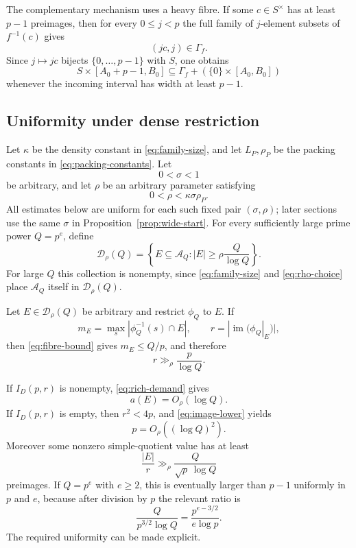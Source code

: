 The complementary mechanism uses a heavy fibre.  If some $c\in S^\times$ has at least $p-1$ preimages, then for every $0\le j<p$ the full family of $j$-element subsets of $f^{-1}(c)$ gives
\[
(jc,j)\in\Gamma_f.
\]
Since $j\mapsto jc$ bijects $\{0,\ldots,p-1\}$ with $S$, one obtains
\begin{equation}\label{eq:poor-rectangle}
S\times[A_0+p-1,B_0]
\subseteq
\Gamma_f+(\{0\}\times[A_0,B_0])
\end{equation}
whenever the incoming interval has width at least $p-1$.

\subsection{Uniformity under dense restriction}

Let $\kappa$ be the density constant in \eqref{eq:family-size}, and let $L_P,\rho_P$ be the packing constants in \eqref{eq:packing-constants}.  Let
\[
0<\sigma<1
\]
be arbitrary, and let $\rho$ be an arbitrary parameter satisfying
\begin{equation}\label{eq:rho-choice}
0<\rho<\kappa\sigma\rho_P.
\end{equation}
All estimates below are uniform for each such fixed pair $(\sigma,\rho)$; later sections use the same $\sigma$ in Proposition~\ref{prop:wide-start}.
For every sufficiently large prime power $Q=p^e$, define
\begin{equation}\label{eq:adm-universal}
\mathcal D_\rho(Q)=
\left\{
E\subseteq\mathcal A_Q:
|E|\ge \rho\frac Q{\log Q}
\right\}.
\end{equation}
For large $Q$ this collection is nonempty, since \eqref{eq:family-size} and \eqref{eq:rho-choice} place $\mathcal A_Q$ itself in $\mathcal D_\rho(Q)$.

Let $E\in\mathcal D_\rho(Q)$ be arbitrary and restrict $\phi_Q$ to $E$.  If
\[
m_E=\max_s|\phi_Q^{-1}(s)\cap E|,
\qquad
r=|\operatorname{im}(\phi_Q|_E)|,
\]
then \eqref{eq:fibre-bound} gives $m_E\le Q/p$, and therefore
\begin{equation}\label{eq:image-lower}
r\gg_\rho\frac p{\log Q}.
\end{equation}

If $I_D(p,r)$ is nonempty, \eqref{eq:rich-demand} gives
\begin{equation}\label{eq:rich-demand-log}
a(E)=O_\rho(\log Q).
\end{equation}
If $I_D(p,r)$ is empty, then $r^2<4p$, and \eqref{eq:image-lower} yields
\begin{equation}\label{eq:poor-p-bound}
p=O_\rho((\log Q)^2).
\end{equation}
Moreover some nonzero simple-quotient value has at least
\begin{equation}\label{eq:heavy-fibre}
\frac{|E|}{r}
\gg_\rho\frac{Q}{\sqrt p\,\log Q}
\end{equation}
preimages.  If $Q=p^e$ with $e\ge2$, this is eventually larger than $p-1$ uniformly in $p$ and $e$, because after division by $p$ the relevant ratio is
\begin{equation}\label{eq:heavy-ratio}
\frac{Q}{p^{3/2}\log Q}
=
\frac{p^{e-3/2}}{e\log p}.
\end{equation}
The required uniformity can be made explicit.

